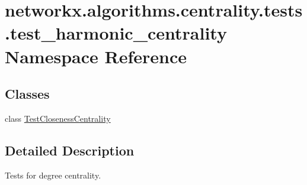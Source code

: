 \hypertarget{namespacenetworkx_1_1algorithms_1_1centrality_1_1tests_1_1test__harmonic__centrality}{}\section{networkx.\+algorithms.\+centrality.\+tests.\+test\+\_\+harmonic\+\_\+centrality Namespace Reference}
\label{namespacenetworkx_1_1algorithms_1_1centrality_1_1tests_1_1test__harmonic__centrality}
\subsection*{Classes}
\begin{DoxyCompactItemize}
\item 
class \hyperlink{classnetworkx_1_1algorithms_1_1centrality_1_1tests_1_1test__harmonic__centrality_1_1TestClosenessCentrality}{Test\+Closeness\+Centrality}
\end{DoxyCompactItemize}


\subsection{Detailed Description}
\begin{DoxyVerb}Tests for degree centrality.
\end{DoxyVerb}
 